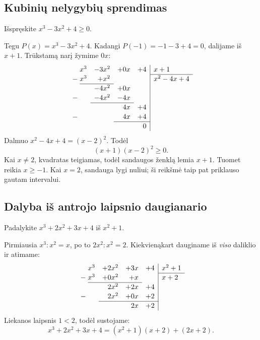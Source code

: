 \documentclass[11pt,a4paper]{scrartcl}
\begin{document}
\subsection{Kubinių nelygybių sprendimas}
\begin{example}
Išspręskite \(x^3-3x^2+4\ge0\).
\end{example}
\begin{solution}
Tegu \(P(x)=x^3-3x^2+4\). Kadangi \(P(-1)=-1-3+4=0\), dalijame iš \(x+1\). Trūkstamą narį žymime \(0x\):
\[
\renewcommand{\arraystretch}{1.12}
\begin{array}{r@{\;}rrrr|l}
 &x^3&-3x^2&+0x&+4&x+1\\\cline{6-6}
 -&x^3&+x^2&&&x^2-4x+4\\\cline{2-3}
 &&-4x^2&+0x&&\\
 -&&-4x^2&-4x&&\\\cline{3-4}
 &&&4x&+4&\\
 -&&&4x&+4&\\\cline{4-5}
 &&&&0&
\end{array}
\]
Dalmuo \(x^2-4x+4=(x-2)^2\). Todėl
\[(x+1)(x-2)^2\ge0.\]
Kai \(x\ne2\), kvadratas teigiamas, todėl sandaugos ženklą lemia \(x+1\). Tuomet reikia \(x\ge-1\). Kai \(x=2\), sandauga lygi nuliui; ši reikšmė taip pat priklauso gautam intervalui.
\ats{\(x\in[-1;+\infty)\).}
\end{solution}
\subsection{Dalyba iš antrojo laipsnio daugianario}
\begin{example}
Padalykite \(x^3+2x^2+3x+4\) iš \(x^2+1\).
\end{example}
\begin{solution}
Pirmiausia \(x^3:x^2=x\), po to \(2x^2:x^2=2\). Kiekvienąkart dauginame iš \emph{viso} daliklio ir atimame:
\[
\renewcommand{\arraystretch}{1.12}
\begin{array}{r@{\;}rrrr|l}
 &x^3&+2x^2&+3x&+4&x^2+1\\\cline{6-6}
 -&x^3&+0x^2&+x&&x+2\\\cline{2-4}
 &&2x^2&+2x&+4&\\
 -&&2x^2&+0x&+2&\\\cline{3-5}
 &&&2x&+2&
\end{array}
\]
Liekanos laipsnis \(1<2\), todėl sustojame:
\[x^3+2x^2+3x+4=(x^2+1)(x+2)+(2x+2).\]
\end{solution}
\end{document}
